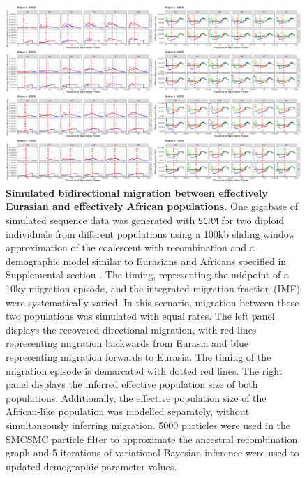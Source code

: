 \begin{figure}
	\centering
	\includegraphics[width=\textwidth]{plot/bidirectional_different_starts.pdf}
	\caption[Simulated bidirectional migration between effectively Eurasian and effectively African populations]{{\bf Simulated bidirectional migration between effectively Eurasian and effectively African populations.} One gigabase of simulated sequence data was generated with {\tt SCRM} for two diploid individuals from different populations using a 100kb sliding window approximation of the coalescent with recombination and a demographic model similar to Eurasians and Africans specified in Supplemental section . The timing, representing the midpoint of a 10ky migration episode, and the integrated migration fraction (IMF) were systematically varied. In this scenario, migration between these two populations was simulated with equal rates. The left panel displays the recovered directional migration, with red lines representing migration backwards from Eurasia and blue representing migration forwards to Eurasia. The timing of the migration episode is demarcated with dotted red lines. The right panel displays the inferred effective population size of both populations. Additionally, the effective population size of the African-like population was modelled separately, without simultaneously inferring migration. 5000 particles were used in the SMCSMC particle filter to approximate the ancestral recombination graph and 5 iterations of variational Bayesian inference were used to updated demographic parameter values.}
	\label{fig:bisim}
\end{figure}


